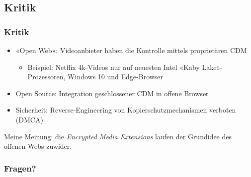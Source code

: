 \documentclass[aspectratio=169]{beamer}
\begin{document}
\subsection{Kritik}
\begin{frame}
\frametitle{Kritik}
\begin{itemize}
    \item{«Open Web»: Videoanbieter haben die Kontrolle mittels proprietären CDM
        \begin{itemize}
            \item{Beispiel: Netflix 4k-Videos nur auf neuesten Intel «Kaby Lake»-Prozessoren, Windows 10 und Edge-Browser}
        \end{itemize}
    }
    \item{Open Source: Integration geschlossener CDM in offene Browser}
    \item{Sicherheit: Reverse-Engineering von Kopierschutzmechanismen verboten (DMCA)}
\end{itemize}
Meine Meinung: die \textit{Encrypted Media Extensions} laufen der Grundidee des offenen Webs zuwider.
\end{frame}

\begin{frame}
\frametitle{Fragen?}
\end{frame}
\end{document}
